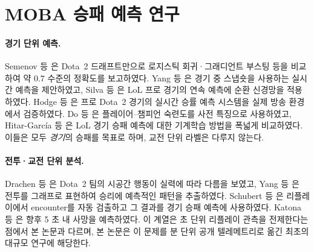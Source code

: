 
\section{MOBA 승패 예측 연구}
\label{sec:bg-related}

\paragraph{경기 단위 예측.} Semenov 등 \cite{semenov2016performance}은 Dota~2 드래프트만으로 로지스틱 회귀·그래디언트 부스팅 등을 비교하여 약 $0.7$ 수준의 정확도를 보고하였다. Yang 등 \cite{yang2016realtime}은 경기 중 스냅숏을 사용하는 실시간 예측을 제안하였고, Silva 등 \cite{silva2018continuous}은 LoL 프로 경기의 연속 예측에 순환 신경망을 적용하였다. Hodge 등 \cite{hodge2021win}은 프로 Dota~2 경기의 실시간 승률 예측 시스템을 실제 방송 환경에서 검증하였다. Do 등 \cite{do2021using}은 플레이어--챔피언 숙련도를 사전 특징으로 사용하였고, Hitar-García 등 \cite{hitar2023machine}은 LoL 경기 승패 예측에 대한 기계학습 방법을 폭넓게 비교하였다. 이들은 모두 \emph{경기}의 승패를 목표로 하며, 교전 단위 라벨은 다루지 않는다.

\paragraph{전투·교전 단위 분석.} Drachen 등 \cite{drachen2014skill}은 Dota~2 팀의 시공간 행동이 실력에 따라 다름을 보였고, Yang 등 \cite{yang2014identifying}은 전투를 그래프로 표현하여 승리에 예측적인 패턴을 추출하였다. Schubert 등 \cite{schubert2016esports}은 리플레이에서 encounter를 자동 검출하고 그 결과를 경기 승패 예측에 사용하였다. Katona 등 \cite{katona2019time}은 향후 5 초 내 사망을 예측하였다. 이 계열은 초 단위 리플레이 관측을 전제한다는 점에서 본 논문과 다르며, 본 논문은 이 문제를 분 단위 공개 텔레메트리로 옮긴 최초의 대규모 연구에 해당한다.
